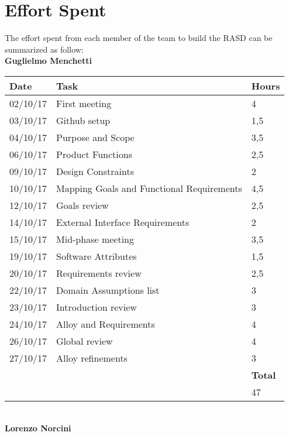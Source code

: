 \section{Effort Spent}

The effort spent from each member of the team to build the RASD can be summarized as follow: \\

\noindent
\textbf{Guglielmo Menchetti}\\

\begin{tabular}{| l | l | l |}
	\hline
	\textbf{Date} & \textbf{Task} & \textbf{Hours}\\
	\hline
	02/10/17 & First meeting & 4\\
	03/10/17 & Github setup & 1,5\\
	04/10/17 & Purpose and Scope & 3,5 \\
	06/10/17 & Product Functions & 2,5 \\
	09/10/17 & Design Constraints & 2 \\
	10/10/17 & Mapping Goals and Functional Requirements & 4,5 \\
	12/10/17 & Goals review & 2,5 \\
	14/10/17 & External Interface Requirements & 2 \\
	15/10/17 & Mid-phase meeting & 3,5 \\
	19/10/17 & Software Attributes & 1,5 \\
	20/10/17 & Requirements review & 2,5 \\
	22/10/17 & Domain Assumptions list & 3 \\
	23/10/17 & Introduction review & 3 \\
	24/10/17 & Alloy and Requirements & 4\\
	26/10/17 & Global review & 4 \\
	27/10/17 & Alloy refinements & 3\\
	\hline
	& & \textbf{Total}\\
	\hline
	& & 47\\	
	\hline

\end{tabular}\\

\newpage
\noindent
\textbf{Lorenzo Norcini}\\

